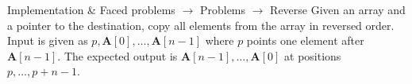 \documentclass[xcolor={usenames}]{beamer}
\begin{document}
  \begin{frame}{Implementation \& Faced problems \(\rightarrow\) Problems \(\rightarrow\) Reverse}
  	Given an array and a pointer to the destination, copy all elements from the array in reversed order. Input is given as $p, \textbf{A}[0], \dots, \textbf{A}[n-1]$ where $p$ points one element after $\textbf{A}[n-1]$. The expected output is $\textbf{A}[n-1], \dots, \textbf{A}[0]$ at positions $p, \dots, p+n-1$.
  	\begin{table}[h!]
		\centering
	\end{table}
  \end{frame}
  \fi
\end{document}
